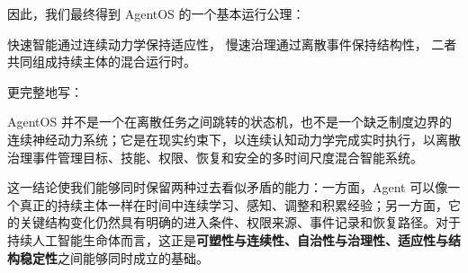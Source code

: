 因此，我们最终得到 AgentOS 的一个基本运行公理：
\begin{conclusion}
快速智能通过连续动力学保持适应性，
慢速治理通过离散事件保持结构性，
二者共同组成持续主体的混合运行时。
\end{conclusion}

更完整地写：
\begin{statementbox}
AgentOS 并不是一个在离散任务之间跳转的状态机，也不是一个缺乏制度边界的连续神经动力系统；它是在现实约束下，以连续认知动力学完成实时执行，以离散治理事件管理目标、技能、权限、恢复和安全的多时间尺度混合智能系统。
\end{statementbox}

这一结论使我们能够同时保留两种过去看似矛盾的能力：一方面，Agent 可以像一个真正的持续主体一样在时间中连续学习、感知、调整和积累经验；另一方面，它的关键结构变化仍然具有明确的进入条件、权限来源、事件记录和恢复路径。对于持续人工智能生命体而言，这正是\textbf{可塑性与连续性、自治性与治理性、适应性与结构稳定性}之间能够同时成立的基础。
